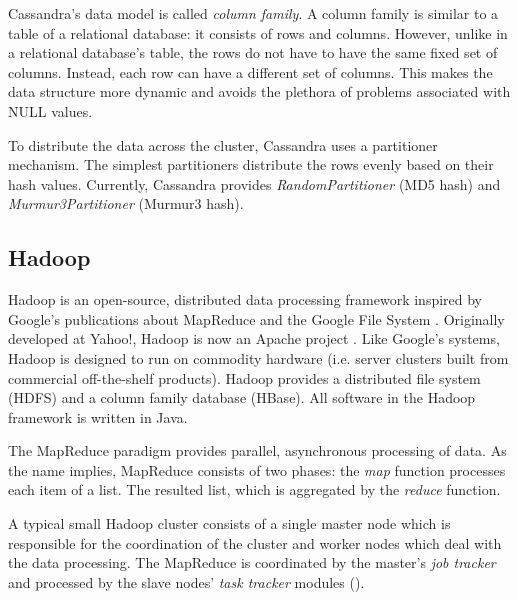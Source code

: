 Cassandra's data model is called \emph{column family}. A column family is similar to a table of a relational database: it consists of rows and columns. However, unlike in a relational database's table, the rows do not have to have the same fixed set of columns. Instead, each row can have a different set of columns. This makes the data structure more dynamic and avoids the plethora of problems associated with NULL values.


To distribute the data across the cluster, Cassandra uses a partitioner mechanism. The simplest partitioners distribute the rows evenly based on their hash values. Currently, Cassandra provides \emph{RandomPartitioner} (MD5 hash) and \emph{Murmur3Partitioner} (Murmur3 hash).


\subsection{Hadoop}

Hadoop is an open-source, distributed data processing framework inspired by Google's publications about MapReduce \cite{Dean:2008:MSD:1327452.1327492} and the Google File System \cite{Ghemawat:2003:GFS:945445.945450}. Originally developed at Yahoo!, Hadoop is now an Apache project \cite{Hadoop}. Like Google's systems, Hadoop is designed to run on commodity hardware (i.e. server clusters built from commercial off-the-shelf products). Hadoop provides a distributed file system (HDFS) and a column family database (HBase). All software in the Hadoop framework is written in Java.

The MapReduce paradigm provides parallel, asynchronous processing of data. As the name implies, MapReduce consists of two phases: the \emph{map} function processes each item of a list. The resulted list, which is aggregated by the \emph{reduce} function.

A typical small Hadoop cluster consists of a single master node which is responsible for the coordination of the cluster and worker nodes which deal with the data processing. The MapReduce is coordinated by the master's \emph{job tracker} and processed by the slave nodes' \emph{task tracker} modules ().


